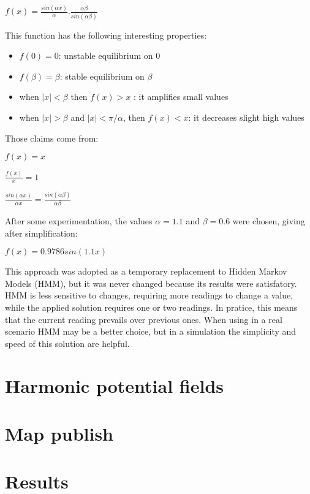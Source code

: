 \documentclass[a4paper,twocolumn]{article}
\begin{document}
    \begin{math}
        f(x) = \frac{sin(\alpha x)}{\alpha} . \frac{\alpha\beta}{sin(\alpha\beta)}
    \end{math}

    This function has the following interesting properties: 
    \begin{itemize}
        \item $f(0) = 0$: unstable equilibrium on 0
        \item $f(\beta) = \beta$: stable equilibrium on $\beta$
        \item when $|x| < \beta$ then $f(x) > x$ : it amplifies small values
        \item when $|x| > \beta$ and $|x|< \pi/\alpha$, then $f(x) < x $: it decreases slight high values
    \end{itemize}

    Those claims come from:

    \begin{math}
        f(x) = x 
    \end{math}

    \begin{math}
        \frac{f(x)}{x} = 1
    \end{math}

    \begin{math}
        \frac{sin(\alpha x)}{\alpha x} = \frac{sin(\alpha\beta)}{\alpha\beta}
    \end{math}

    After some experimentation, the values $\alpha = 1.1$ and $\beta = 0.6$ were chosen, giving after simplification:
    
    \begin{math}
        f(x) = 0.9786 sin(1.1 x)
    \end{math}

    This approach was adopted as a temporary replacement to Hidden Markov Models (HMM), but it was never changed because its results were satisfatory. HMM is less sensitive to changes, requiring more readings to change a value, while the applied solution requires one or two readings. In pratice, this means that the current reading prevails over previous ones. When using in a real scenario HMM may be a better choice, but in a simulation the simplicity and speed of this solution are helpful.

\section{Harmonic potential fields}

\section{Map publish}

\section{Results}



\end{document}
